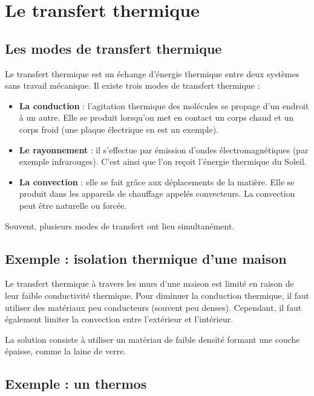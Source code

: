 \documentclass[11pt]{article}
\begin{document}
	
	 
	\section*{Le transfert thermique}
	
	\subsection*{Les modes de transfert thermique}
	
	Le transfert thermique est un échange d’énergie thermique entre deux systèmes sans travail mécanique.  
	Il existe trois modes de transfert thermique :
	
	\begin{itemize}
		\item \textbf{La conduction} : l’agitation thermique des molécules se propage d’un endroit à un autre. Elle se produit lorsqu’on met en contact un corps chaud et un corps froid (une plaque électrique en est un exemple).
		
		\item \textbf{Le rayonnement} : il s’effectue par émission d’ondes électromagnétiques (par exemple infrarouges). C’est ainsi que l’on reçoit l’énergie thermique du Soleil.
		
		\item \textbf{La convection} : elle se fait grâce aux déplacements de la matière. Elle se produit dans les appareils de chauffage appelés convecteurs. La convection peut être naturelle ou forcée.
	\end{itemize}
	
	Souvent, plusieurs modes de transfert ont lieu simultanément.
	
	\subsection*{Exemple : isolation thermique d'une maison}
	
	Le transfert thermique à travers les murs d’une maison est limité en raison de leur faible conductivité thermique.  
	Pour diminuer la conduction thermique, il faut utiliser des matériaux peu conducteurs (souvent peu denses). Cependant, il faut également limiter la convection entre l’extérieur et l’intérieur.
	
	La solution consiste à utiliser un matériau de faible densité formant une couche épaisse, comme la laine de verre.
	
	\subsection*{Exemple : un thermos}
	
\end{document}
